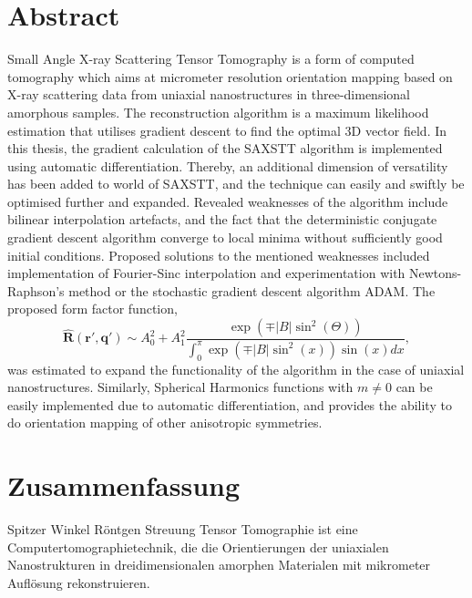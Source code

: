 


\begingroup
\let\clearpage\relax
\let\cleardoublepage\relax
\let\cleardoublepage\relax

\chapter*{Abstract}

Small Angle X-ray Scattering Tensor Tomography is a form of computed tomography which aims at micrometer resolution orientation mapping based on X-ray scattering data from
uniaxial nanostructures in three-dimensional amorphous samples.
The reconstruction algorithm is a maximum likelihood estimation that utilises gradient descent to find the optimal 3D vector field.
In this thesis, the gradient calculation of the SAXSTT algorithm is implemented using automatic differentiation.
Thereby, an additional dimension of versatility has been added to world of SAXSTT, and the technique can easily and swiftly be optimised further and expanded.
Revealed weaknesses of the algorithm include bilinear interpolation artefacts,
and the fact that the deterministic conjugate gradient descent algorithm converge to local minima without sufficiently good initial conditions.
Proposed solutions to the mentioned weaknesses included implementation of Fourier-Sinc interpolation and experimentation with Newtons-Raphson's method or the stochastic gradient descent algorithm ADAM.
The proposed form factor function,
\begin{equation*}
    \bm{\widehat{R}}(\bm{r'}, \bm{q'}) \sim A_{0}^{2} + A_{1}^{2}\frac{ \exp\left(\mp |B| \sin^2(\Theta) \right) } {\int_{0}^{\pi} \exp\left( \mp |B| \sin^{2}(x) \right) \sin(x) dx},
\end{equation*}
was estimated to expand the functionality of the algorithm in the case of uniaxial nanostructures.
Similarly, Spherical Harmonics functions with $m \neq 0$ can be easily implemented due to automatic differentiation,
and provides the ability to do orientation mapping of other anisotropic symmetries.

\clearpage
\chapter*{Zusammenfassung}
Spitzer Winkel Röntgen Streuung Tensor Tomographie ist eine Computertomographietechnik,
die die Orientierungen der uniaxialen Nanostrukturen in dreidimensionalen amorphen Materialen mit mikrometer Auflösung rekonstruieren.

\endgroup

\vfill

